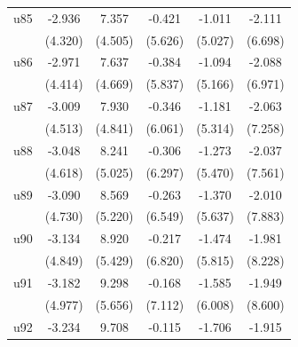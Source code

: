 \begin{table}[htbp]
\begin{tabular}{l*{5}{c}}
\addlinespace
u85                 &      -2.936         &       7.357         &      -0.421         &      -1.011         &      -2.111         \\
                    &     (4.320)         &     (4.505)         &     (5.626)         &     (5.027)         &     (6.698)         \\
\addlinespace
u86                 &      -2.971         &       7.637         &      -0.384         &      -1.094         &      -2.088         \\
                    &     (4.414)         &     (4.669)         &     (5.837)         &     (5.166)         &     (6.971)         \\
\addlinespace
u87                 &      -3.009         &       7.930         &      -0.346         &      -1.181         &      -2.063         \\
                    &     (4.513)         &     (4.841)         &     (6.061)         &     (5.314)         &     (7.258)         \\
\addlinespace
u88                 &      -3.048         &       8.241         &      -0.306         &      -1.273         &      -2.037         \\
                    &     (4.618)         &     (5.025)         &     (6.297)         &     (5.470)         &     (7.561)         \\
\addlinespace
u89                 &      -3.090         &       8.569         &      -0.263         &      -1.370         &      -2.010         \\
                    &     (4.730)         &     (5.220)         &     (6.549)         &     (5.637)         &     (7.883)         \\
\addlinespace
u90                 &      -3.134         &       8.920         &      -0.217         &      -1.474         &      -1.981         \\
                    &     (4.849)         &     (5.429)         &     (6.820)         &     (5.815)         &     (8.228)         \\
\addlinespace
u91                 &      -3.182         &       9.298         &      -0.168         &      -1.585         &      -1.949         \\
                    &     (4.977)         &     (5.656)         &     (7.112)         &     (6.008)         &     (8.600)         \\
\addlinespace
u92                 &      -3.234         &       9.708         &      -0.115         &      -1.706         &      -1.915         \\

\end{tabular}
\end{table}
